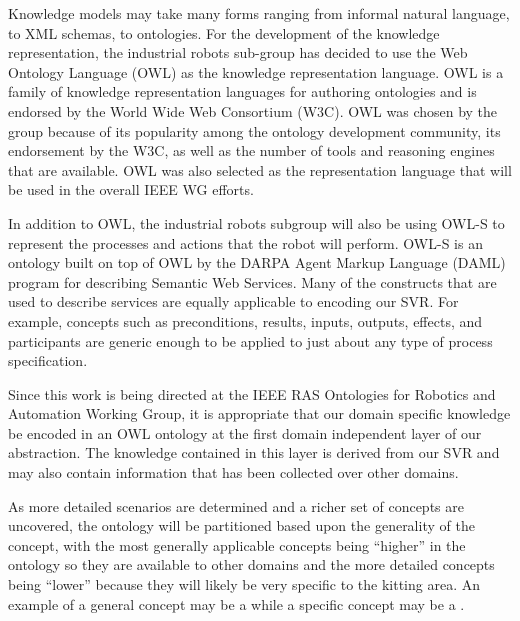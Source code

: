 Knowledge models may take many forms ranging from informal natural language, to XML schemas, to ontologies.
For the development of the  knowledge representation, the industrial robots sub-group has decided to use the  Web Ontology Language (OWL) \cite{OWL} as the knowledge representation language. OWL is a family of knowledge representation languages for authoring ontologies and is endorsed by the World Wide Web Consortium (W3C).
 OWL was chosen by the group because of its popularity among the ontology development community, its endorsement by the W3C, as well as the number of tools and reasoning engines that are available. OWL was also selected as the representation language that will be used in the overall IEEE WG efforts.

In addition to OWL, the industrial robots subgroup will also be using OWL-S \cite{Martin2012} to represent the processes and actions that the robot will perform. OWL-S is an ontology built on top of OWL by the DARPA Agent Markup Language (DAML) program \cite{damlWeb}
for describing Semantic Web Services. Many of the constructs that are used to describe services are equally applicable to encoding our SVR. For example, concepts such as preconditions, results, inputs, outputs, effects, and participants are generic enough to be applied to just about any type of process specification.

Since this work is being directed at the IEEE RAS Ontologies for Robotics and Automation Working Group, it is appropriate that our  domain specific knowledge  be
encoded in an OWL ontology at the first domain independent  layer of our abstraction. The knowledge contained in this layer is derived from our SVR and may also contain
information that has been collected over other domains.

As more detailed scenarios are determined and a richer set of concepts are uncovered, the ontology will be partitioned based upon the generality of the concept, with the most generally applicable concepts being ``higher'' in the ontology so they are available to other domains and the more detailed concepts being ``lower'' because they will likely be very specific to the kitting area. An example of a general concept may be a  while a specific concept may be a .

